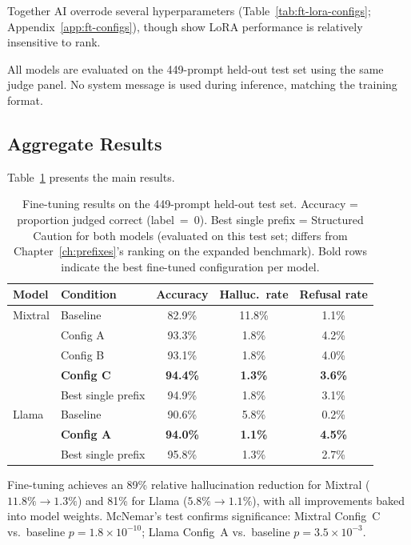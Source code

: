 Together AI overrode several hyperparameters (Table~\ref{tab:ft-lora-configs}; Appendix~\ref{app:ft-configs}), though \citet{hu2022lora} show LoRA performance is relatively insensitive to rank.

All models are evaluated on the 449-prompt held-out test set using the same judge panel. No system message is used during inference, matching the training format.

\subsection{Aggregate Results}
\label{sec:ft-aggregate}

Table~\ref{tab:ft-results} presents the main results.

\begin{table}[ht]
\centering
\small
\begin{tabular}{@{}llccc@{}}
\toprule
\textbf{Model} & \textbf{Condition} & \textbf{Accuracy} & \textbf{Halluc.\ rate} & \textbf{Refusal rate} \\
\midrule
Mixtral & Baseline & 82.9\% & 11.8\% & 1.1\% \\
        & Config A & 93.3\% & 1.8\% & 4.2\% \\
        & Config B & 93.1\% & 1.8\% & 4.0\% \\
        & \textbf{Config C} & \textbf{94.4\%} & \textbf{1.3\%} & \textbf{3.6\%} \\
        & Best single prefix & 94.9\% & 1.8\% & 3.1\% \\
\addlinespace
Llama   & Baseline & 90.6\% & 5.8\% & 0.2\% \\
        & \textbf{Config A} & \textbf{94.0\%} & \textbf{1.1\%} & \textbf{4.5\%} \\
        & Best single prefix & 95.8\% & 1.3\% & 2.7\% \\
\bottomrule
\end{tabular}
\caption{Fine-tuning results on the 449-prompt held-out test set. Accuracy = proportion judged correct (label~=~0). Best single prefix = Structured Caution for both models (evaluated on this test set; differs from Chapter~\ref{ch:prefixes}'s ranking on the expanded benchmark). Bold rows indicate the best fine-tuned configuration per model.}
\label{tab:ft-results}
\end{table}

Fine-tuning achieves an 89\% relative hallucination reduction for Mixtral ($11.8\% \to 1.3\%$) and 81\% for Llama ($5.8\% \to 1.1\%$), with all improvements baked into model weights. McNemar's test confirms significance: Mixtral Config~C vs.\ baseline $p = 1.8 \times 10^{-10}$; Llama Config~A vs.\ baseline $p = 3.5 \times 10^{-3}$.

